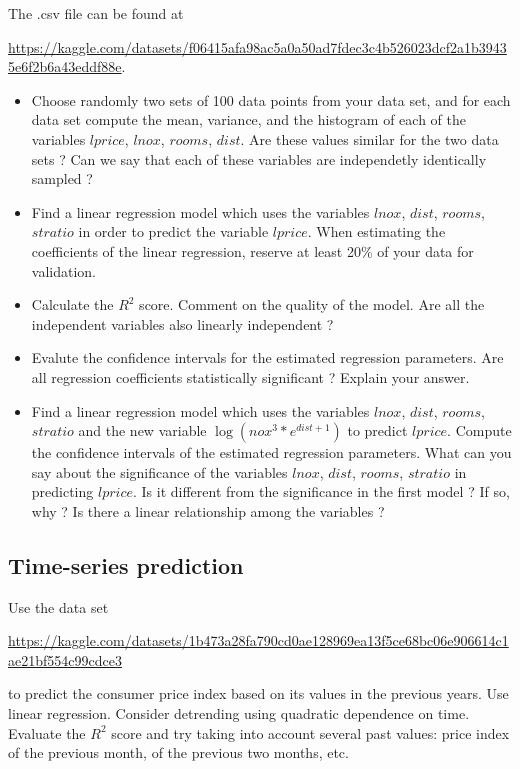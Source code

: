 \documentclass{article}
\begin{document}
   The .csv file can be found at 

    \url{https://kaggle.com/datasets/f06415afa98ac5a0a50ad7fdec3c4b526023dcf2a1b39435e6f2b6a43eddf88e}.%
    
 \begin{itemize}
	 \item Choose randomly two sets of 100 data points from your data set, and for each data set compute the mean, variance, and the histogram
	of each of the variables  $lprice$, $lnox$, $rooms$,  $dist$. 
	Are these values similar for the two data sets ?  Can we say that each of these variables are independetly identically sampled ? 

   \item Find a linear regression model which uses the variables $lnox$, $dist$, $rooms$, $stratio$  in order to predict the variable $lprice$.
     When estimating the coefficients of the linear regression, reserve at least 20\% of your data for validation.
  \item Calculate the $R^2$ score. Comment on the quality of the model. Are all the independent variables also linearly independent ?
  \item Evalute the confidence intervals for the estimated regression parameters. Are all regression coefficients statistically significant ? Explain your answer.
  \item Find a  linear regression model which uses the variables $lnox$, $dist$, $rooms$, $stratio$ and the new variable
	$\log(nox^3*e^{dist+1})$ to predict $lprice$. Compute the confidence intervals of the estimated regression parameters.
	What can you say about the significance of the variables $lnox$, $dist$, $rooms$, $stratio$ in predicting $lprice$.
	Is it different from the significance in the first model ? If so, why ? Is there a linear relationship among the variables ? 
  \end{itemize}

   
 \subsection*{Time-series prediction}
   Use the data set 
   
    \url{https://kaggle.com/datasets/1b473a28fa790cd0ae128969ea13f5ce68bc06e906614c1ae21bf554c99cdce3} 

    to predict the consumer price index 
   based on its values in the previous years.    Use linear regression.
   Consider detrending using quadratic dependence on time.  
   Evaluate the $R^2$ score and try taking into account several past values: price index  of the previous month, of the previous two months, etc. 
\end{document}
